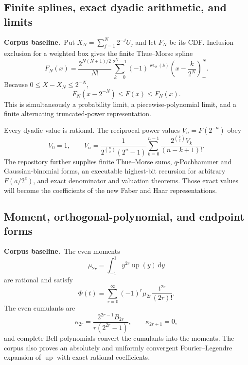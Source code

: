 \documentclass[11pt,oneside]{article}
\theoremstyle{definition}
\theoremstyle{remark}
\newcommand{\Up}{\operatorname{up}}
\newcommand{\dd}{\,\mathrm d}
\newcommand{\wt}{\operatorname{wt}_2}
\newcommand{\1}{\mathbf 1}
\newcommand{\baseline}{\textcolor{linkblue}{\textbf{Corpus baseline.}}\ }
\begin{document}
\subsection{Finite splines, exact dyadic arithmetic, and limits}

\baseline Put $X_N=\sum_{j=1}^N2^{-j}U_j$ and let $F_N$ be its CDF.  Inclusion--exclusion
for a weighted box gives the finite Thue--Morse spline
\begin{equation}
 F_N(x)=\frac{2^{N(N+1)/2}}{N!}
 \sum_{k=0}^{2^N-1}(-1)^{\wt(k)}
 \left(x-\frac{k}{2^N}\right)_+^N.                      \label{eq:finite-spline}
\end{equation}
Because $0\le X-X_N\le2^{-N}$,
\begin{equation}
 F_N(x-2^{-N})\le F(x)\le F_N(x).                        \label{eq:spline-bracket}
\end{equation}
This is simultaneously a probability limit, a piecewise-polynomial limit,
and a finite alternating truncated-power representation.

Every dyadic value is rational.  The reciprocal-power values
$V_n=F(2^{-n})$ obey
\begin{equation}
 V_0=1,
 \qquad
 V_n=\frac{1}{2^{\binom n2}(2^n-1)}
 \sum_{k=0}^{n-1}
 \frac{2^{\binom k2}V_k}{(n-k+1)!}.                      \label{eq:V-recurrence}
\end{equation}
The repository further supplies finite Thue--Morse sums, $q$-Pochhammer and
Gaussian-binomial forms, an executable highest-bit recursion for arbitrary
$F(a/2^e)$, and exact denominator and valuation theorems.  Those exact values
will become the coefficients of the new Faber and Haar representations.

\subsection{Moment, orthogonal-polynomial, and endpoint forms}

\baseline The even moments
\begin{equation}
 \mu_{2r}=\int_{-1}^{1}y^{2r}\Up(y)\dd y
\end{equation}
are rational and satisfy
\begin{equation}
 \Phi(t)=\sum_{r=0}^\infty(-1)^r\mu_{2r}\frac{t^{2r}}{(2r)!}.  \label{eq:moment-series}
\end{equation}
The even cumulants are
\begin{equation}
 \kappa_{2r}=\frac{2^{2r-1}B_{2r}}{r(2^{2r}-1)},
 \qquad \kappa_{2r+1}=0,                                \label{eq:cumulants}
\end{equation}
and complete Bell polynomials convert the cumulants into the moments.
The corpus also proves an absolutely and uniformly convergent
Fourier--Legendre expansion of $\Up$ with exact rational coefficients.
\end{document}
